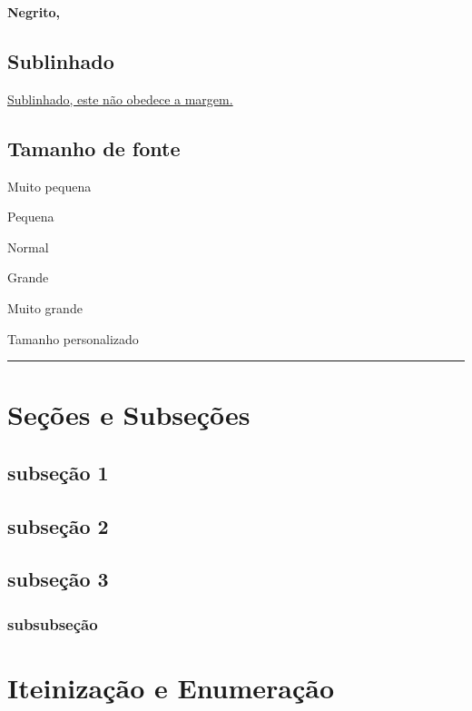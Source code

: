 \documentclass[twoside]{article}
\begin{document}
	\begin{center}
		\textbf{Negrito, \lipsum[3]}
	\end{center}


	\subsection{Sublinhado}

	\underline{Sublinhado, este não obedece a margem.}

	\subsection{Tamanho de fonte}
	
	\begin{center}
		{\tiny Muito pequena} 

		{\small Pequena} 

		{\normalsize Normal} 

		{\large Grande} 

		{\huge Muito grande}

		{\fontsize{25}{10}\selectfont Tamanho personalizado}
	\end{center}
	
	\hrule
	
	\section{Seções e Subseções}
	\lipsum[1]
	
	\subsection{subseção 1}
	\lipsum[2]
	
	\subsection{subseção 2}
	\lipsum[3-4]
	
	\subsection{subseção 3}
	\lipsum[5]
	
	\subsubsection{subsubseção}
	\lipsum[6]
	
	\section{Iteinização e Enumeração}
	
\end{document}
